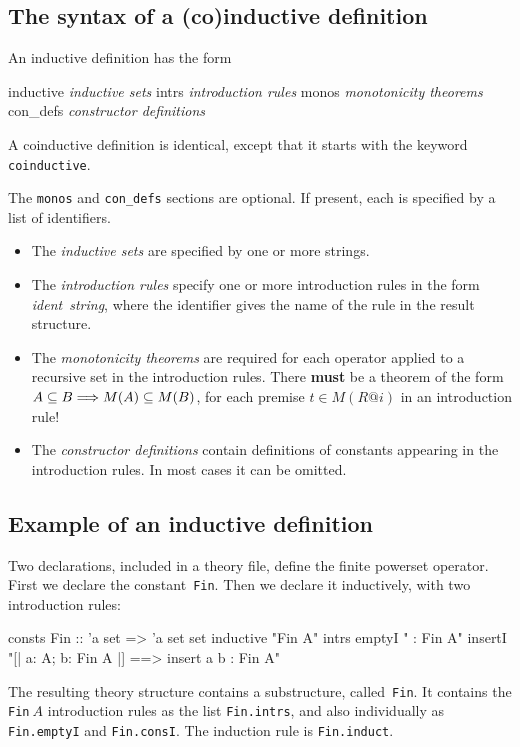 \subsection{The syntax of a (co)inductive definition}
An inductive definition has the form
\begin{ttbox}
inductive    {\it inductive sets}
  intrs      {\it introduction rules}
  monos      {\it monotonicity theorems}
  con_defs   {\it constructor definitions}
\end{ttbox}
A coinductive definition is identical, except that it starts with the keyword
{\tt coinductive}.  

The \texttt{monos} and \texttt{con_defs} sections are optional.  If present,
each is specified by a list of identifiers.

\begin{itemize}
\item The \textit{inductive sets} are specified by one or more strings.

\item The \textit{introduction rules} specify one or more introduction rules in
  the form \textit{ident\/}~\textit{string}, where the identifier gives the name of
  the rule in the result structure.

\item The \textit{monotonicity theorems} are required for each operator
  applied to a recursive set in the introduction rules.  There {\bf must}
  be a theorem of the form $A\subseteq B\Longrightarrow M(A)\subseteq M(B)$, for each
  premise $t\in M(R@i)$ in an introduction rule!

\item The \textit{constructor definitions} contain definitions of constants
  appearing in the introduction rules.  In most cases it can be omitted.
\end{itemize}


\subsection{Example of an inductive definition}
Two declarations, included in a theory file, define the finite powerset
operator.  First we declare the constant~{\tt Fin}.  Then we declare it
inductively, with two introduction rules:
\begin{ttbox}
consts Fin :: 'a set => 'a set set
inductive "Fin A"
  intrs
    emptyI  "{\ttlbrace}{\ttrbrace} : Fin A"
    insertI "[| a: A;  b: Fin A |] ==> insert a b : Fin A"
\end{ttbox}
The resulting theory structure contains a substructure, called~{\tt Fin}.
It contains the \texttt{Fin}$~A$ introduction rules as the list \texttt{Fin.intrs},
and also individually as \texttt{Fin.emptyI} and \texttt{Fin.consI}.  The induction
rule is \texttt{Fin.induct}.

